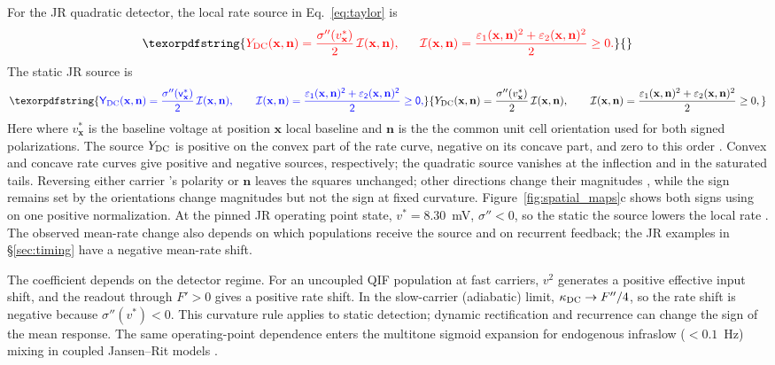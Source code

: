 \documentclass[11pt,a4paper]{article}
\newcommand{\Sig}{\sigma}
\providecommand{\DIFaddtex}[1]{{\protect\color{blue} \sf #1}} %
\providecommand{\DIFdeltex}[1]{{\protect\color{red} \scriptsize #1}} %
\providecommand{\DIFaddbegin}{} %
\providecommand{\DIFaddend}{} %
\providecommand{\DIFdelbegin}{} %
\providecommand{\DIFdelend}{} %
\providecommand{\DIFadd}[1]{\texorpdfstring{\DIFaddtex{#1}}{#1}} %
\providecommand{\DIFdel}[1]{\texorpdfstring{\DIFdeltex{#1}}{}} %
\begin{document}
\DIFdelbegin \DIFdel{For the JR quadratic detector, the local rate source in Eq.~\eqref{eq:taylor} is
}\[
\DIFdel{Y_{\rm DC}(\mathbf x,\mathbf n)
=\frac{\Sig''(v^*_{\mathbf x})}{2}\,\mathcal I(\mathbf x,\mathbf n),
\qquad
\mathcal I(\mathbf x,\mathbf n)
=\frac{\varepsilon_1(\mathbf x,\mathbf n)^2+
\varepsilon_2(\mathbf x,\mathbf n)^2}{2}\ge0.
}\]%
\DIFdelend \DIFaddbegin \DIFadd{The static JR source is
}\[
\DIFadd{Y_{\rm DC}(\mathbf x,\mathbf n)
=\frac{\Sig''(v^*_{\mathbf x})}{2}\,\mathcal I(\mathbf x,\mathbf n),
\qquad
\mathcal I(\mathbf x,\mathbf n)
=\frac{\varepsilon_1(\mathbf x,\mathbf n)^2+
\varepsilon_2(\mathbf x,\mathbf n)^2}{2}\ge0,
}\]\DIFaddend
\DIFdelbegin \DIFdel{Here }\DIFdelend \DIFaddbegin \DIFadd{where }\DIFaddend $v^*_{\mathbf x}$ is the \DIFdelbegin \DIFdel{baseline voltage at position $\mathbf x$ }\DIFdelend \DIFaddbegin \DIFadd{local baseline }\DIFaddend and $\mathbf n$ \DIFdelbegin \DIFdel{is the }\DIFdelend \DIFaddbegin \DIFadd{the common
}\DIFaddend unit cell orientation\DIFdelbegin \DIFdel{used for both signed polarizations. The source $Y_{\rm DC}$ is positive on the convex part of the rate curve,
negative on its concave part, and zero to this order }\DIFdelend \DIFaddbegin \DIFadd{. Convex and concave rate curves give positive and
negative sources, respectively; the quadratic source vanishes }\DIFaddend at the inflection
\DIFaddbegin \DIFadd{and in the saturated tails}\DIFaddend .
Reversing either carrier \DIFdelbegin \DIFdel{'s polarity }\DIFdelend or $\mathbf n$ leaves the squares unchanged;
other \DIFdelbegin \DIFdel{directions change their magnitudes , while the sign remains set by the }\DIFdelend \DIFaddbegin \DIFadd{orientations change magnitudes but not the sign at }\DIFaddend fixed curvature.
Figure~\ref{fig:spatial_maps}c shows both signs \DIFdelbegin \DIFdel{using }\DIFdelend \DIFaddbegin \DIFadd{on }\DIFaddend one positive normalization.
At the pinned JR \DIFdelbegin \DIFdel{operating point }\DIFdelend \DIFaddbegin \DIFadd{state, }\DIFaddend $v^*=8.30$~mV, \DIFdelbegin \DIFdel{$\Sig''<0$, so the static
}\DIFdelend \DIFaddbegin \DIFadd{the }\DIFaddend source lowers the local rate
\DIFdelbegin \DIFdel{.
The observed mean-rate change also depends on which populations receive the source and on recurrent feedback; the JR examples in \S\ref{sec:timing} have
a negative mean-rate shift.
}%

\DIFdel{The coefficient depends on the detector regime.
For an uncoupled QIF population
at fast carriers, $v^2$ generates a positive effective input shift, and the
readout through $F'>0$ gives a positive rate shift. In the slow-carrier
(adiabatic) limit, $\kappa_{\rm DC}\to F''/4$, so the rate shift is negative
}\DIFdelend \DIFaddbegin \DIFadd{because $\Sig''(v^*)<0$.
This curvature rule applies to static detection; dynamic rectification and
recurrence can change the sign of the mean response.
The same operating-point dependence enters the multitone sigmoid expansion for
endogenous infraslow ($<0.1$~Hz) mixing in coupled Jansen--Rit models \cite{Just2026mixing}.
}
\end{document}
